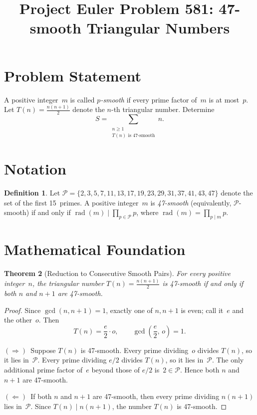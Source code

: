\documentclass[12pt]{article}
\title{Project Euler Problem 581: 47-smooth Triangular Numbers}
\author{}
\date{}
\newtheorem{theorem}{Theorem}
\theoremstyle{definition}
\newtheorem{definition}[theorem]{Definition}
\begin{document}
\maketitle

\section{Problem Statement}

A positive integer~$m$ is called \emph{$p$-smooth} if every prime factor of~$m$ is at most~$p$. Let $T(n) = \frac{n(n+1)}{2}$ denote the $n$-th triangular number. Determine
\[
S = \sum_{\substack{n \ge 1 \\ T(n) \text{ is } 47\text{-smooth}}} n.
\]

\section{Notation}

\begin{definition}
Let $\mathcal{P} = \{2,3,5,7,11,13,17,19,23,29,31,37,41,43,47\}$ denote the set of the first 15~primes. A positive integer~$m$ is \emph{47-smooth} (equivalently, $\mathcal{P}$-smooth) if and only if $\operatorname{rad}(m) \mid \prod_{p \in \mathcal{P}} p$, where $\operatorname{rad}(m) = \prod_{p \mid m} p$.
\end{definition}

\section{Mathematical Foundation}

\begin{theorem}[Reduction to Consecutive Smooth Pairs]
For every positive integer~$n$, the triangular number $T(n) = \frac{n(n+1)}{2}$ is 47-smooth if and only if both $n$ and $n+1$ are 47-smooth.
\end{theorem}

\begin{proof}
Since $\gcd(n, n+1) = 1$, exactly one of $n, n+1$ is even; call it~$e$ and the other~$o$. Then
\[
T(n) = \frac{e}{2} \cdot o, \qquad \gcd\!\left(\frac{e}{2},\, o\right) = 1.
\]

$(\Rightarrow)$~Suppose $T(n)$ is 47-smooth. Every prime dividing~$o$ divides $T(n)$, so it lies in~$\mathcal{P}$. Every prime dividing $e/2$ divides $T(n)$, so it lies in~$\mathcal{P}$. The only additional prime factor of~$e$ beyond those of $e/2$ is~$2 \in \mathcal{P}$. Hence both $n$ and $n+1$ are 47-smooth.

$(\Leftarrow)$~If both $n$ and $n+1$ are 47-smooth, then every prime dividing $n(n+1)$ lies in~$\mathcal{P}$. Since $T(n) \mid n(n+1)$, the number $T(n)$ is 47-smooth.
\end{proof}
\end{document}
